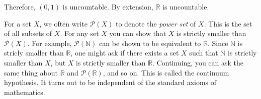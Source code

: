             Therefore, $(0,1)$ is uncountable. By extension,
            $\mathbb{R}$ is uncountable.
            \par\hfill\par
            \vspace{-2ex}
            For a set $X$, we often write
            $\mathcal{P}(X)$ to denote the
            \textit{power set} of $X$. This is the
            set of all subsets of $X$.
            For any set $X$ you can show that $X$ is
            strictly smaller than $\mathcal{P}(X)$.
            For example, $\mathcal{P}(\mathbb{N})$
            can be shown to be equivalent to $\mathbb{R}$.
            Since $\mathbb{N}$ is stricly smaller than
            $\mathbb{R}$, one might ask if there exists
            a set $X$ such that $\mathbb{N}$ is strictly
            smaller than $X$, but $X$ is strictly smaller
            than $\mathbb{R}$. Continuing, you can ask the
            same thing about $\mathbb{R}$ and
            $\mathcal{P}(\mathbb{R})$, and so on.
            This is called the continuum hypothesis.
            It turns out to be independent of
            the standard axioms of mathematics.
